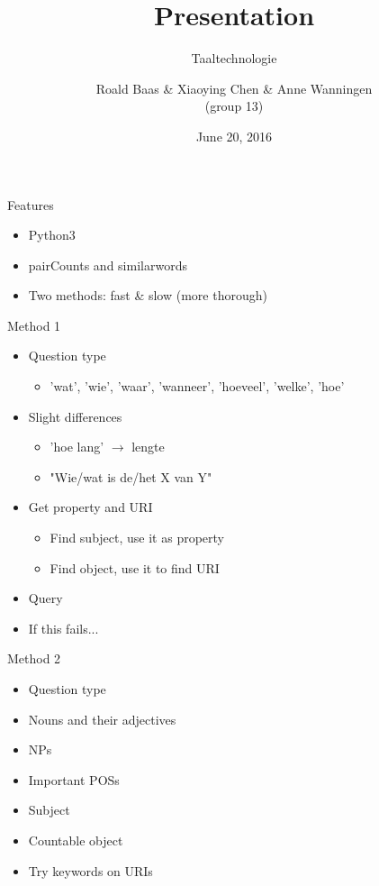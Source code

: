 \documentclass[pdf]{beamer}
\title{Presentation}
\subtitle{Taaltechnologie}
\author{Roald Baas \& Xiaoying Chen \& Anne Wanningen\\(group 13)}
\date{June 20, 2016}
\begin{document}
  \begin{frame}
    \titlepage
  \end{frame}


  \begin{frame}{Features}
    \begin{itemize}
      \item Python3
      \item pairCounts and similarwords
      \item Two methods: fast \& slow (more thorough)
    \end{itemize}
  \end{frame}
  
  \begin{frame}{Method 1}
    \begin{itemize}
      \item Question type %
      \begin{itemize}
        \item 'wat', 'wie', 'waar', 'wanneer', 'hoeveel', 'welke', 'hoe'
      \end{itemize}
      \item Slight differences
      \begin{itemize}
        \item 'hoe lang' $\rightarrow$ lengte
        \item "Wie/wat is de/het X van Y"
      \end{itemize}
      \item Get property and URI
      \begin{itemize}
        \item Find subject, use it as property
        \item Find object, use it to find URI
      \end{itemize}
      \item Query
      \item If this fails...
    \end{itemize}
  \end{frame}
  
  \begin{frame}{Method 2}
    \begin{itemize}
      \item Question type %
      \item Nouns and their adjectives
      \item NPs %
      \item Important POSs %
      \item Subject
      \item Countable object
      \item Try keywords on URIs
    \end{itemize}
  \end{frame}
  
\end{document}
